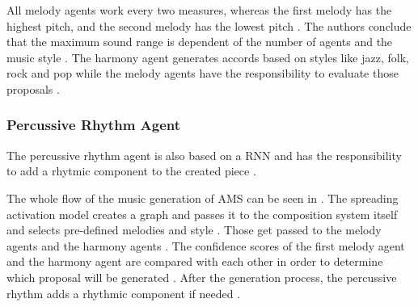 All melody agents work every two measures, whereas the
first melody has the highest pitch, and the second melody 
has the lowest pitch \cite{hutMcCormAms}. The authors conclude that the 
maximum sound range is dependent of the number of agents
and the music style \cite{hutMcCormAms}.
The harmony agent generates accords based on styles like
jazz, folk, rock and pop while the melody agents 
have the responsibility to evaluate those proposals \cite{hutMcCormAms}.

\subsubsection{Percussive Rhythm Agent}

The percussive rhythm agent is also based on a RNN and
has the responsibility to add a rhytmic component to
the created piece \cite{hutMcCormAms}.



The whole flow of the music generation of AMS can be seen in 
. The spreading activation model creates a graph
and passes it to the composition system itself and selects pre-defined melodies
and style \cite{hutMcCormAms}. Those get passed to the melody agents and the harmony agents \cite{hutMcCormAms}.
The confidence scores of the first melody agent and the harmony agent are compared
with each other in order to determine which proposal will be generated \cite{hutMcCormAms}.
After the generation process, the percussive rhythm adds a rhythmic component if needed \cite{hutMcCormAms}.






